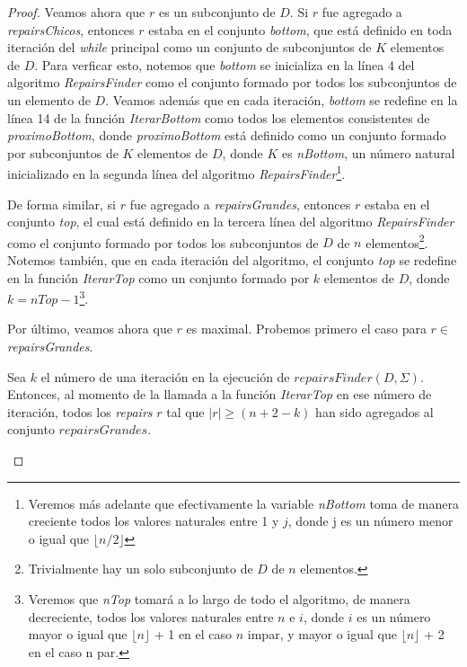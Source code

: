 \documentclass[11pt,a4paper,twoside]{tesis}
\begin{document}
\begin{proof}
Veamos ahora que $r$ es un subconjunto de $D$. Si $r$ fue agregado a \textit{repairsChicos}, entonces $r$ estaba en el conjunto \textit{bottom}, que está definido en toda iteración del \textit{while} principal como un conjunto de subconjuntos de $K$ elementos de $D$. Para verficar esto, notemos que \textit{bottom} se inicializa en la línea 4 del algoritmo \textit{RepairsFinder} como el conjunto formado por todos los subconjuntos de un elemento de $D$. Veamos además que en cada iteración, \textit{bottom} se redefine en la línea 14 de la función \textit{IterarBottom} como todos los elementos consistentes de \textit{proximoBottom}, donde \textit{proximoBottom} está definido como un conjunto formado por subconjuntos de $K$ elementos de $D$, donde $K$ es \textit{nBottom}, un número natural inicializado en la segunda línea del algoritmo \textit{RepairsFinder}\footnote{Veremos más adelante que efectivamente la variable \textit{nBottom} toma de manera creciente todos los valores naturales entre 1 y $j$, donde j es un número menor o igual que $\lfloor n/2 \rfloor$}.

De forma similar, si $r$ fue agregado a \textit{repairsGrandes}, entonces $r$ estaba en el conjunto \textit{top}, el cual está definido en la tercera línea del algoritmo \textit{RepairsFinder} como el conjunto formado por todos los subconjuntos de $D$ de $n$ elementos\footnote{Trivialmente hay un solo subconjunto de $D$ de $n$ elementos.}. Notemos también, que en cada iteración del algoritmo, el conjunto \textit{top} se redefine en la función \textit{IterarTop} como un conjunto formado por $k$ elementos de $D$, donde $k = nTop - 1$\footnote{Veremos que \textit{nTop} tomará a lo largo de todo el algoritmo, de manera decreciente, todos los valores naturales entre $n$ e $i$, donde $i$ es un número mayor o igual que $\lfloor n \rfloor$ + 1 en el caso $n$ impar, y mayor o igual que  $\lfloor n \rfloor$ + 2 en el caso n par.}.

Por último, veamos ahora que $r$ es maximal. Probemos primero el caso para $r \in$  \textit{repairsGrandes}.




\begin{lemma}\label{repairs_grandes_agregados}
Sea $k$ el número de una iteración en la ejecución de $repairsFinder(D, \Sigma)$. Entonces, al momento de la llamada a la función \textit{IterarTop} en ese número de iteración, todos los \textit{repairs} $r$ tal que $|r| \geq (n + 2 - k)$ han sido agregados al conjunto $repairsGrandes$.
\end{lemma}


\end{proof}
\end{document}
